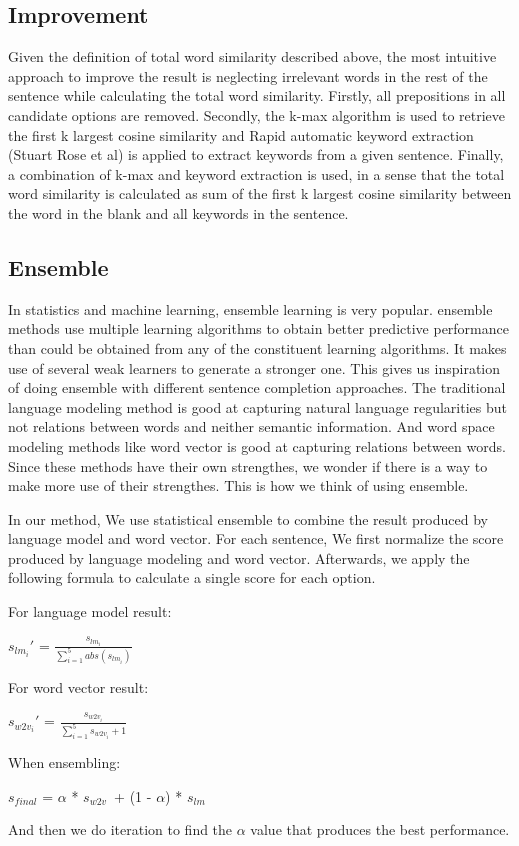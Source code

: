 \documentclass[11pt]{article}
\begin{document}
\subsection{Improvement}
Given the definition of total word similarity described above, the most intuitive approach to improve the result is neglecting irrelevant words in the rest of the sentence while calculating the total word similarity. Firstly, all prepositions in all candidate options are removed. Secondly, the k-max algorithm is used to retrieve the first k largest cosine similarity and Rapid automatic keyword extraction (Stuart Rose et al) is applied to extract keywords from a given sentence. Finally, a combination of k-max and keyword extraction is used, in a sense that the total word similarity is calculated as sum of the first k largest cosine similarity between the word in the blank and all keywords in the sentence. 
\subsection{Ensemble}
In statistics and machine learning, ensemble learning is very popular. ensemble methods use multiple learning algorithms to obtain better predictive performance than could be obtained from any of the constituent learning algorithms. It makes use of several weak learners to generate a stronger one. This gives us inspiration of doing ensemble with different sentence completion approaches. The traditional language modeling method is good at capturing natural language regularities but not relations between words and neither semantic information. And word space modeling methods like word vector is good at capturing relations between words. Since these methods have their own strengthes, we wonder if there is a way to make more use of their strengthes. This is how we think of using ensemble.

In our method,  We use statistical ensemble to combine the result produced by language model and word vector. For each sentence, We first normalize the score produced by language modeling and word vector. Afterwards, we apply the following formula to calculate a single score for each option. 

 For language model result:
\begin{center}
$s_{lm_i}'$ = $\frac{s_{lm_i}}{\sum_{i=1}^{5}{abs(s_{lm_i})}}$
\end{center}
For word vector result:
\begin{center}
$s_{w2v_i}'$ = $\frac{s_{w2v_i}}{\sum_{i=1}^{5}{s_{w2v_i}+1}}$ 
\end{center}
When ensembling:
\begin{center}
$s_{final}$ = $\alpha$ * $ s_{w2v}$\ + (1 - $\alpha$) * $s_{lm}$
\end{center}
And then we do iteration to find the $\alpha$ value that produces the best performance.
\end{document}
